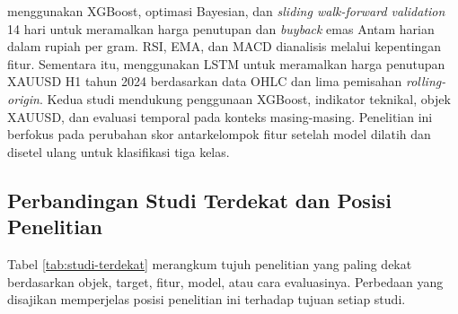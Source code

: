 \textcite{hisyam2025implementasi} menggunakan XGBoost, optimasi Bayesian, dan \emph{sliding walk-forward validation} 14 hari untuk meramalkan harga penutupan dan \emph{buyback} emas Antam harian dalam rupiah per gram. RSI, EMA, dan MACD dianalisis melalui kepentingan fitur. Sementara itu, \textcite{arif2026multivariate} menggunakan LSTM untuk meramalkan harga penutupan XAUUSD H1 tahun 2024 berdasarkan data OHLC dan lima pemisahan \emph{rolling-origin}. Kedua studi mendukung penggunaan XGBoost, indikator teknikal, objek XAUUSD, dan evaluasi temporal pada konteks masing-masing. Penelitian ini berfokus pada perubahan skor antarkelompok fitur setelah model dilatih dan disetel ulang untuk klasifikasi tiga kelas.

\subsection{Perbandingan Studi Terdekat dan Posisi Penelitian}

Tabel \ref{tab:studi-terdekat} merangkum tujuh penelitian yang paling dekat berdasarkan objek, target, fitur, model, atau cara evaluasinya. Perbedaan yang disajikan memperjelas posisi penelitian ini terhadap tujuan setiap studi.

